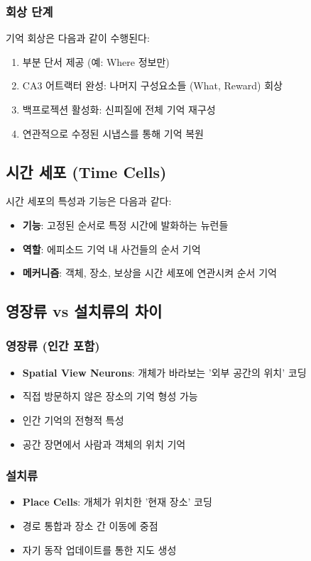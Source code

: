 \documentclass[openany]{book}
\begin{document}
\begin{appendices}
\subsubsection{회상 단계}
기억 회상은 다음과 같이 수행된다:

\begin{enumerate}
\item 부분 단서 제공 (예: Where 정보만)
\item CA3 어트랙터 완성: 나머지 구성요소들 (What, Reward) 회상
\item 백프로젝션 활성화: 신피질에 전체 기억 재구성
\item 연관적으로 수정된 시냅스를 통해 기억 복원
\end{enumerate}

\subsection{시간 세포 (Time Cells)}
시간 세포의 특성과 기능은 다음과 같다:

\begin{itemize}
\item \textbf{기능}: 고정된 순서로 특정 시간에 발화하는 뉴런들
\item \textbf{역할}: 에피소드 기억 내 사건들의 순서 기억
\item \textbf{메커니즘}: 객체, 장소, 보상을 시간 세포에 연관시켜 순서 기억
\end{itemize}

\subsection{영장류 vs 설치류의 차이}

\subsubsection{영장류 (인간 포함)}
\begin{itemize}
\item \textbf{Spatial View Neurons}: 개체가 바라보는 '외부 공간의 위치' 코딩
\item 직접 방문하지 않은 장소의 기억 형성 가능
\item 인간 기억의 전형적 특성
\item 공간 장면에서 사람과 객체의 위치 기억
\end{itemize}

\subsubsection{설치류}
\begin{itemize}
\item \textbf{Place Cells}: 개체가 위치한 '현재 장소' 코딩
\item 경로 통합과 장소 간 이동에 중점
\item 자기 동작 업데이트를 통한 지도 생성
\end{itemize}


\end{appendices}
\end{document}
